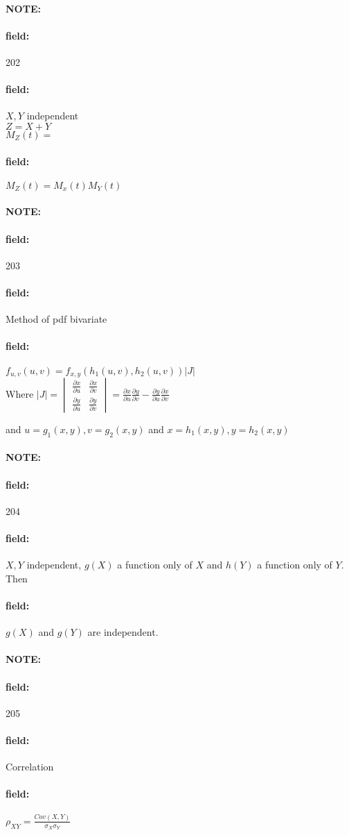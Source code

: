 \documentclass[12pt]{article}
\newenvironment{note}{\paragraph{NOTE:}}{}
\newenvironment{field}{\paragraph{field:}}{}
\begin{document}
\begin{note} \begin{field} \tiny 202 \end{field}
  \begin{field}
    $X,Y$ independent\\ $Z = X + Y$  \\ $M_Z(t) = $
  \end{field}
  \begin{field}
    $M_Z(t) = M_x(t)M_Y(t)$
  \end{field}
\end{note}

\begin{note} \begin{field} \tiny 203 \end{field}
  \begin{field}
    Method of pdf bivariate
  \end{field}
  \begin{field}
    $f_{u,v}(u,v) = f_{x,y}(h_1(u,v),h_2(u,v))|J|$\\
    Where $|J| = \begin{vmatrix}
      \frac{\partial  x}{\partial  u} & \frac{\partial  x }{\partial v }\\ \frac{\partial  y }{\partial u } & \frac{\partial  y }{\partial v }
    \end{vmatrix} = \frac{\partial  x }{\partial u } \frac{\partial  y}{\partial v } - \frac{\partial  y }{\partial u } \frac{\partial  x }{\partial v }$

    and $u = g_1(x,y), v = g_2(x,y)$ and $x = h_1(x,y), y = h_2(x,y)$
  \end{field}
\end{note}


\begin{note} \begin{field} \tiny 204 \end{field}
  \begin{field}
    $X,Y$ independent, $g(X)$ a function only of $X$ and $h(Y)$ a function only of $Y$. Then
  \end{field}
  \begin{field}
    $g(X)$ and $g(Y)$ are independent.
  \end{field}
\end{note}

\begin{note} \begin{field} \tiny 205 \end{field}
  \begin{field}
    Correlation
  \end{field}
  \begin{field}
    $\rho_{XY} = \frac{Cov(X,Y)}{\sigma_X\sigma_Y}$
  \end{field}
\end{note}
\end{document}
